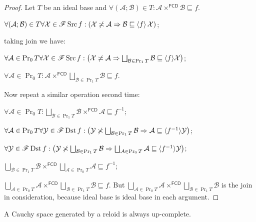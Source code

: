 \begin{proof}
  Let $T$ be an ideal base and $\forall (\mathcal{A} ; \mathcal{B}) \in T :
  \mathcal{A} \times^{\mathsf{FCD}} \mathcal{B} \sqsubseteq f$.
  
  $\forall (\mathcal{A} ; \mathcal{B}) \in T \forall \mathcal{X} \in
  \mathscr{F} \operatorname{Src} f : (\mathcal{X} \not\asymp \mathcal{A} \Rightarrow
  \mathcal{B} \sqsubseteq \left\langle f\right\rangle \mathcal{X})$;
  
  taking join we have:
  
  $\forall \mathcal{A} \in \Pr_0 T \forall \mathcal{X} \in \mathscr{F}
  \Src f : \left( \mathcal{X} \nasymp \mathcal{A} \Rightarrow
  \bigsqcup_{\mathcal{B} \in \Pr_1 T} \mathcal{B} \sqsubseteq \langle f
  \rangle \mathcal{X} \right)$;
  
  $\forall \mathcal{A} \in \Pr_0 T : \mathcal{A} \times^{\mathsf{FCD}}
  \bigsqcup_{\mathcal{B} \in \Pr_1 T} \mathcal{B} \sqsubseteq f$.
  
  Now repeat a similar operation second time:
  
  $\forall \mathcal{A} \in \Pr_0 T : \bigsqcup_{\mathcal{B} \in \Pr_1 T}
  \mathcal{B} \times^{\mathsf{FCD}} \mathcal{A} \sqsubseteq f^{- 1}$;
  
  $\forall \mathcal{A} \in \Pr_0 T \forall \mathcal{Y} \in \mathscr{F}
  \Dst f : \left( \mathcal{Y} \nasymp \bigsqcup_{\mathcal{B} \in \Pr_1
  T} \mathcal{B} \Rightarrow \mathcal{A} \sqsubseteq \langle f^{- 1} \rangle
  \mathcal{Y} \right)$;
  
  $\forall \mathcal{Y} \in \mathscr{F} \Dst f : \left( \mathcal{Y}
  \nasymp \bigsqcup_{\mathcal{B} \in \Pr_1 T} \mathcal{B} \Rightarrow
  \bigsqcup_{\mathcal{A} \in \Pr_0 T} \mathcal{A} \sqsubseteq \langle f^{- 1}
  \rangle \mathcal{Y} \right)$;
  
  $\bigsqcup_{\mathcal{B} \in \Pr_1 T} \mathcal{B}
  \times^{\mathsf{FCD}} \bigsqcup_{\mathcal{A} \in \Pr_0 T} \mathcal{A}
  \sqsubseteq f^{- 1}$;
  
  $\bigsqcup_{\mathcal{A} \in \Pr_0 T} \mathcal{A}
  \times^{\mathsf{FCD}} \bigsqcup_{\mathcal{B} \in \Pr_1 T} \mathcal{B}
  \sqsubseteq f$. But $\bigsqcup_{\mathcal{A} \in \Pr_0 T} \mathcal{A}
  \times^{\mathsf{FCD}} \bigsqcup_{\mathcal{B} \in \Pr_1 T}
  \mathcal{B}$ is the join in consideration, because ideal base is ideal base
  in each argument.
\end{proof}

\begin{prop}
  A Cauchy space generated by a reloid is always up-complete.
\end{prop}

